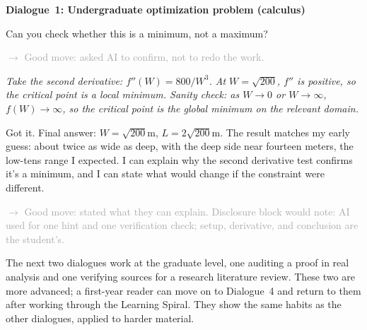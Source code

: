 \documentclass{SIAMbook2023}
\newenvironment{dialogue}[1]%
  {\par\medskip\noindent\textbf{\textcolor{guideblue}{#1}}\par\smallskip
   \begin{list}{}{\setlength{\leftmargin}{1.5em}\setlength{\rightmargin}{0.5em}\setlength{\itemsep}{0.4em}\setlength{\topsep}{0pt}}}
  {\end{list}\par\medskip}
\newcommand{\studentturn}[1]{\item[\textbf{Student.}] #1}
\newcommand{\aiturn}[1]{\item[\textbf{AI.}] \textit{#1}}
\newcommand{\dialogueannotate}[1]{\par\smallskip\hspace{2em}\textcolor{darkgray}{\footnotesize\textsf{$\rightarrow$ #1}}\par}
\begin{document}
\begin{dialogue}{Dialogue~1: Undergraduate optimization problem (calculus)}
\studentturn{Can you check whether this is a minimum, not a maximum?}
\dialogueannotate{Good move: asked AI to confirm, not to redo the work.}

\aiturn{Take the second derivative: $f''(W) = 800/W^3$. At $W = \sqrt{200}$, $f''$ is positive, so the critical point is a local minimum. Sanity check: as $W \to 0$ or $W \to \infty$, $f(W) \to \infty$, so the critical point is the global minimum on the relevant domain.}

\studentturn{Got it. Final answer: $W = \sqrt{200}\text{m}$, $L = 2\sqrt{200}\text{m}$. The result matches my early guess: about twice as wide as deep, with the deep side near fourteen meters, the low-tens range I expected. I can explain why the second derivative test confirms it's a minimum, and I can state what would change if the constraint were different.}
\dialogueannotate{Good move: stated what they can explain. Disclosure block would note: AI used for one hint and one verification check; setup, derivative, and conclusion are the student's.}
\end{dialogue}

The next two dialogues work at the graduate level, one auditing a proof in real analysis and one verifying sources for a research literature review. These two are more advanced; a first-year reader can move on to Dialogue~4 and return to them after working through the Learning Spiral. They show the same habits as the other dialogues, applied to harder material.
\end{document}
